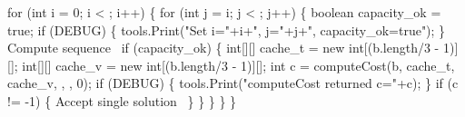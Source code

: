   for (int i = 0; i < ; i++) \{
    for (int j = i; j < ; j++) \{
      boolean capacity_ok = true;
      if (DEBUG) \{
        tools.Print("Set i="+i+", j="+j+", capacity_ok=true");
      \}
      \LA{}Compute sequence~{\nwtagstyle{}}\RA{}
      if (capacity_ok) \{
        int[][] cache_t = new int[(b.length/3 - 1)][];
        int[][] cache_v = new int[(b.length/3 - 1)][];
        int c = computeCost(b, cache_t, cache_v, , , 0);
        if (DEBUG) \{
          tools.Print("computeCost returned c="+c);
        \}
        if (c != -1) \{
          \LA{}Accept single solution~{\nwtagstyle{}}\RA{}
        \}
      \}
    \}
  \}
\}
\nwendcode{}\nwdocspar

